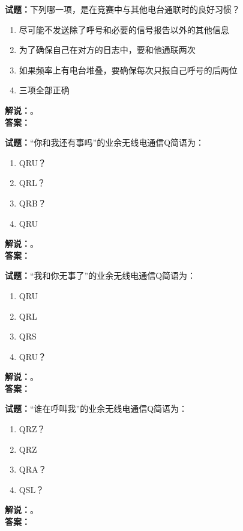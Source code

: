 \documentclass{ctexbook}
\begin{document}
\vspace{\baselineskip}

\noindent\textbf{试题：}下列哪一项，是在竞赛中与其他电台通联时的良好习惯？
\begin{enumerate}[leftmargin=3em]
  \item 尽可能不发送除了呼号和必要的信号报告以外的其他信息
  \item 为了确保自己在对方的日志中，要和他通联两次
  \item 如果频率上有电台堆叠，要确保每次只报自己呼号的后两位
  \item 三项全部正确
\end{enumerate}
\noindent\textbf{解说：}\textbf{}。\\\noindent\textbf{答案：}

\vspace{\baselineskip}

\noindent\textbf{试题：}“你和我还有事吗”的业余无线电通信Q简语为：
\begin{enumerate}[leftmargin=3em]
  \item QRU？
  \item QRL？
  \item QRB？
  \item QRU
\end{enumerate}
\noindent\textbf{解说：}\textbf{}。\\\noindent\textbf{答案：}

\vspace{\baselineskip}

\noindent\textbf{试题：}“我和你无事了”的业余无线电通信Q简语为：
\begin{enumerate}[leftmargin=3em]
  \item QRU
  \item QRL
  \item QRS
  \item QRU？
\end{enumerate}
\noindent\textbf{解说：}\textbf{}。\\\noindent\textbf{答案：}

\vspace{\baselineskip}

\noindent\textbf{试题：}“谁在呼叫我”的业余无线电通信Q简语为：
\begin{enumerate}[leftmargin=3em]
  \item QRZ？
  \item QRZ
  \item QRA？
  \item QSL？
\end{enumerate}
\noindent\textbf{解说：}\textbf{}。\\\noindent\textbf{答案：}
\end{document}
